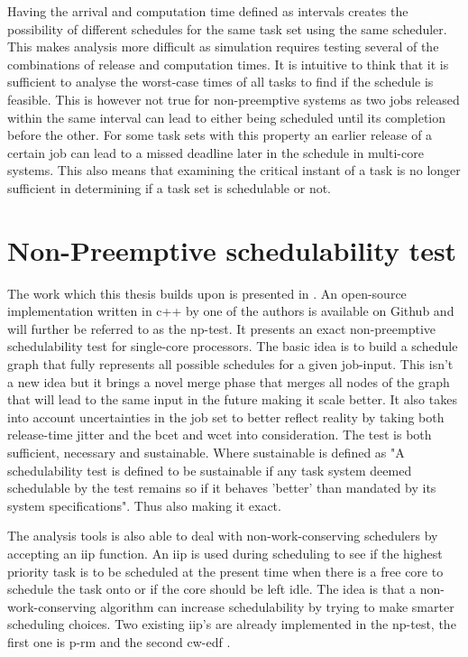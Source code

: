 \documentclass{kththesis}
\begin{document}
Having the arrival and computation time defined as intervals creates the possibility of different
schedules for the same task set using the same scheduler. This makes analysis more difficult as
simulation requires testing several of the combinations of release and computation times. It is
intuitive to think that it is sufficient to analyse the worst-case times of all tasks to find if the
schedule is feasible. This is however not true for non-preemptive systems as two jobs released
within the same interval can lead to either being scheduled until its completion before the other.
For some task sets with this property an earlier release of a certain job can lead to a missed
deadline later in the schedule in multi-core systems. This also means that examining the critical
instant of a task is no longer sufficient in determining if a task set is schedulable or not.


\section{Non-Preemptive schedulability test}

The work which this thesis builds upon is presented in \parencite{nasri_exact_2017}. An open-source
implementation written in c++ by one of the authors is available on
Github\parencite{brandenburg_implementation_2018} and will further be referred to as the
\acrfull{np}-test. It presents an exact non-preemptive schedulability test for single-core
processors. The basic idea is to build a schedule graph that fully represents all possible schedules
for a given job-input. This isn't a new idea but it brings a novel merge phase that merges all nodes
of the graph that will lead to the same input in the future making it scale better. It also takes
into account uncertainties in the job set to better reflect reality by taking both release-time
jitter and the \acrshort{bcet} and \acrshort{wcet} into consideration. The test is both sufficient, 
necessary and sustainable. Where sustainable is defined as "A schedulability test is defined to
be sustainable if any task system deemed schedulable by the test remains so if it behaves 'better' than
mandated by its system specifications"\parencite{baruah_sustainable_2006}. Thus also making it exact.

The analysis tools is also able to deal with non-work-conserving schedulers by accepting an
\acrshort{iip} function. An \acrfull{iip} is used during scheduling to see if the highest priority
task is to be scheduled at the present time when there is a free core to schedule the task onto or
if the core should be left idle. The idea is that a non-work-conserving algorithm can increase
schedulability by trying to make smarter scheduling choices. Two existing \acrshort{iip}'s are
already implemented in the \acrshort{np}-test, the first one is \acrfull{p-rm}
\parencite{nasri_precautious-rm:_2014} and the second \acrfull{cw-edf}
\parencite{nasri_non-work-conserving_2016}.
\end{document}
